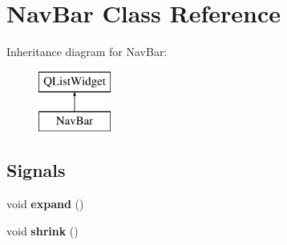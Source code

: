 \hypertarget{classNavBar}{\section{Nav\-Bar Class Reference}
\label{classNavBar}
}
Inheritance diagram for Nav\-Bar\-:\begin{figure}[H]
\begin{center}
\leavevmode
\includegraphics[height=2.000000cm]{classNavBar}
\end{center}
\end{figure}
\subsection*{Signals}
\begin{DoxyCompactItemize}
\item 
\hypertarget{classNavBar_a97d92d9d3a79f215b598fa507499707d}{void {\bfseries expand} ()}\label{classNavBar_a97d92d9d3a79f215b598fa507499707d}

\item 
\hypertarget{classNavBar_ab92546779d1fb94c21bbf2d7991faaa3}{void {\bfseries shrink} ()}\label{classNavBar_ab92546779d1fb94c21bbf2d7991faaa3}

\end{DoxyCompactItemize}

